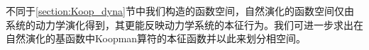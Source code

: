 不同于\ref{section:Koop_dyna}节中我们构造的函数空间，自然演化的函数空间仅由系统的动力学演化得到，其更能反映动力学系统的本征行为。我们可进一步求出在自然演化的基函数中Koopman算符的本征函数并以此来划分相空间。



% 
% 
